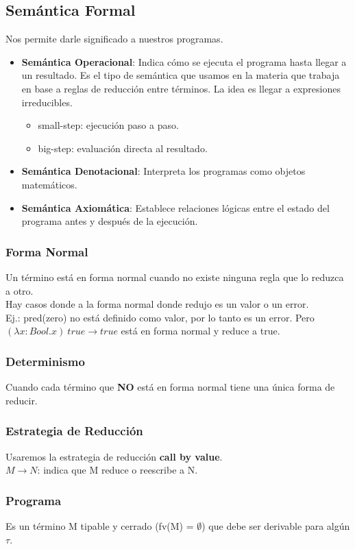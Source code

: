 \documentclass[10pt,a4paper]{article}
\begin{document}
\subsection*{Semántica Formal}
Nos permite darle significado a nuestros programas.
\begin{itemize}
    \item \textbf{Semántica Operacional}: Indica cómo se ejecuta el programa hasta llegar a un resultado. Es el tipo de semántica que usamos en la materia que trabaja en base a reglas de reducción entre términos. La idea es llegar a expresiones irreducibles.
    \begin{itemize}
        \item small-step: ejecución paso a paso.
        \item big-step: evaluación directa al resultado.
    \end{itemize}
    \item \textbf{Semántica Denotacional}:  Interpreta los programas como objetos matemáticos.
    \item \textbf{Semántica Axiomática}: Establece relaciones lógicas entre el estado del programa antes y después de la ejecución.
\end{itemize}
\subsubsection*{Forma Normal}
Un término está en forma normal cuando no existe ninguna regla que lo reduzca a otro. \\
Hay casos donde a la forma normal donde redujo es un valor o un error. \\
Ej.: pred(zero) no está definido como valor, por lo tanto es un error. Pero $(\lambda x:Bool. x) \ true \rightarrow true$ está en forma normal y reduce a true.
\subsubsection*{Determinismo}
Cuando cada término que \textbf{NO} está en forma normal tiene una única forma de reducir.
\subsubsection*{Estrategia de Reducción}
Usaremos la estrategia de reducción \textbf{call by value}. \\
$M \rightarrow N$: indica que M reduce o reescribe a N. 
\subsubsection*{Programa}
Es un término M tipable y cerrado (fv(M) = $\emptyset$) que debe ser derivable para algún $\tau$. 
\end{document}
